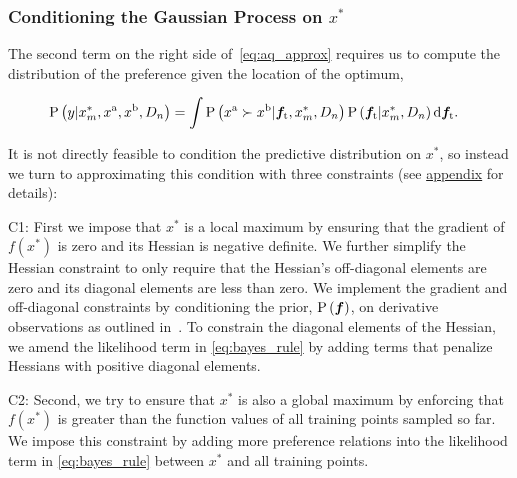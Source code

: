 \subsubsection[Conditioning the Gaussian Process on optima]{Conditioning the
Gaussian Process on $x^*$} The second term on the right side
of~\cref{eq:aq_approx} requires us to compute the distribution of the
preference given the location of the optimum,
\begin{fullwidth}
\begin{align}
&\prob{y| x_m^*, x^\tn{a}, x^\tn{b}, D_n} =
    \int \prob{x^\tn{a} \succ x^\tn{b} | \vecf{f}[\tn{t}], x_m^*, D_n} 
    \prob{\vecf{f}[\tn{t}] | x_m^*, D_n} \tn{d} \vecf{f}[\tn{t}].
    \label{eq:predic_pref_w_constraint}
\end{align}
\end{fullwidth}
It is not directly feasible to condition the predictive distribution on $x^*$,
so instead we turn to approximating this condition with three constraints (see
\hyperlink{sec:appendix}{appendix} for details):

C1: First we impose that $x^*$ is a local maximum by ensuring that the gradient
of $f(x^*)$ is zero and its Hessian is negative definite. We further simplify
the Hessian constraint to only require that the Hessian's off-diagonal elements
are zero and its diagonal elements are less than zero. We implement the gradient
and off-diagonal constraints by conditioning the prior, $\prob{\vecf{f}}$, on
derivative observations as outlined in~\citep{solak2003derivative}. To constrain
the diagonal elements of the Hessian, we amend the likelihood term in
\cref{eq:bayes_rule} by adding terms that penalize Hessians with positive
diagonal elements.

C2: Second, we try to ensure that $x^*$ is also a global maximum by enforcing
that $f(x^*)$ is greater than the function values of all training points sampled
so far. We impose this constraint by adding more preference relations into the
likelihood term in \cref{eq:bayes_rule} between $x^*$ and all training points.

